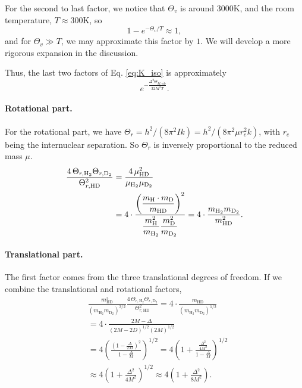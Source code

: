 \documentclass[twocolumn, 10pt]{article}
\numberwithin{equation}{section}
\newenvironment{solution}[1][\empty]
{\par\medskip\sffamily
  \textbf{\ifx\empty#1{Solution.}\relax\else{#1}\fi} \ignorespaces}
{\medskip}
\begin{document}
\begin{solution}
  For the second to last factor,
  we notice that
  $\Theta_v$ is around $3000$K,
  and the room temperature, $T \approx 300$K,
  so
  $$
  1 - e^{-\Theta_v/T} \approx 1,
  $$
  and for $\Theta_v \gg T$,
  we may approximate this factor by $1$.
  We will develop a more rigorous expansion
  in the discussion.

  Thus, the last two factors of Eq. \eqref{eq:K_iso}
  is approximately
  $$
    e^{-\frac{\Delta^2
    \Theta_{M, \mathrm{vib} }
    }{32M^2 T}}
    .
  $$

  \paragraph*{Rotational part.}
  For the rotational part,
  we have
  $\Theta_r = h^2/(8\pi^2Ik) = h^2/(8\pi^2\mu r_e^2 k)$,
  with $r_e$
  being the internuclear separation.
  So $\Theta_r$ is inversely proportional to
  the reduced mass $\mu$.
  \begin{align}
    \frac{
      4 \, \Theta_{r, \mathrm{H}_2}
      \Theta_{r, \mathrm{D}_2}
    } {
      \Theta_{r, \mathrm{HD}}^2
    }
    &=
    \frac{ 4 \, \mu_\mathrm{HD}^2 }
    { \mu_\mathrm{H_2} \mu_\mathrm{D_2} }
    \notag \\
    &=
    4 \cdot
    \frac{
    \left(
        \dfrac{ m_\mathrm{H} \cdot m_\mathrm{D} }
        { m_\mathrm{HD} }
    \right)^2 }
    {
        \dfrac{ m_\mathrm{H}^2 }
        { m_\mathrm{H_2} }
        \dfrac{ m_\mathrm{D}^2 }
        { m_\mathrm{D_2} }
    }
    =
    4\cdot
    \frac{
        m_\mathrm{H_2}
        m_\mathrm{D_2}
    }
    {
        m_\mathrm{HD}^2
    }
    .
    \label{eq:ratio_rot}
  \end{align}

  \paragraph*{Translational part.}

  The first factor comes from
  the three translational degrees of freedom.
  If we combine the translational and rotational factors,
  \begin{align*}
    &\frac{
      m_{\mathrm{HD}}^3
    } {
      \left(
      m_{\mathrm{H}_2}
      m_{\mathrm{D}_2}
      \right)^{3/2}
    }
    \frac{
      4 \, \Theta_{r, \mathrm{H}_2}
      \Theta_{r, \mathrm{D}_2}
    } {
      \Theta_{r, \mathrm{HD}}^2
    }
    =
    4 \cdot
    \frac{
      m_{\mathrm{HD}}
    } {
      \left(
        m_{\mathrm{H}_2}
        m_{\mathrm{D}_2}
      \right)^{1/2}
    }
    \\
    &=
    4 \cdot
    \frac{
      2M-\Delta
    } {
      (2M-2D)^{1/2} (2M)^{1/2}
    }
    \\
    &=
    4
    \left(
    \frac{
      (1-\frac{\Delta}{2M})^2
    } {
      1-\frac{\Delta}{M}
    }
    \right)^{1/2}
    =
    4
    \left(
    1 +
    \frac{
      \frac{\Delta^2}{4M^2}
    } {
      1-\frac{\Delta}{M}
    }
    \right)^{1/2}
    \\
    &\approx
    4
    \left(
    1 + \frac{\Delta^2}{4M^2}
    \right)^{1/2}
    \approx
    4 \left(
    1 + \frac{\Delta^2}{8M^2}
    \right)
    .
  \end{align*}


\end{solution}
\end{document}

